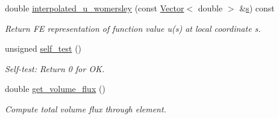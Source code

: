\begin{DoxyCompactItemize}
double \hyperlink{classoomph_1_1WomersleyEquations_a6b45d8a95f8f811e766fcf3466bfeb09}{interpolated\+\_\+u\+\_\+womersley} (const \hyperlink{classoomph_1_1Vector}{Vector}$<$ double $>$ \&\hyperlink{cfortran_8h_ab7123126e4885ef647dd9c6e3807a21c}{s}) const
\begin{DoxyCompactList}\small\item\em Return FE representation of function value u(s) at local coordinate s. \end{DoxyCompactList}\item 
unsigned \hyperlink{classoomph_1_1WomersleyEquations_acdcc63b1f495caa704aec0c5c170b030}{self\+\_\+test} ()
\begin{DoxyCompactList}\small\item\em Self-\/test\+: Return 0 for OK. \end{DoxyCompactList}\item 
double \hyperlink{classoomph_1_1WomersleyEquations_ab04034e44e876ea9935a4ae102c34ce9}{get\+\_\+volume\+\_\+flux} ()
\begin{DoxyCompactList}\small\item\em Compute total volume flux through element. \end{DoxyCompactList}\end{DoxyCompactItemize}
